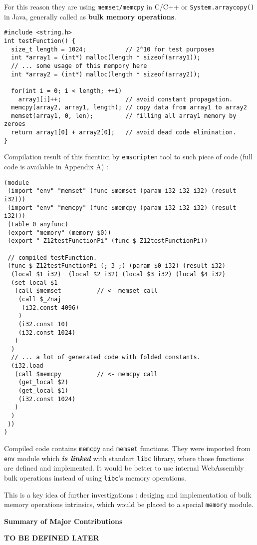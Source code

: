 For this reason they are using \texttt{memset/memcpy} in C/C++ or \texttt{System.arraycopy()} in Java, generally called as \textbf{bulk memory operations}. 

\begin{verbatim}
#include <string.h>
int testFunction() {
  size_t length = 1024;           // 2^10 for test purposes 
  int *array1 = (int*) malloc(length * sizeof(array1));
  // ... some usage of this mempory here
  int *array2 = (int*) malloc(length * sizeof(array2));
  
  for(int i = 0; i < length; ++i)
    array1[i]++;                  // avoid constant propagation. 
  memcpy(array2, array1, length); // copy data from array1 to array2 
  memset(array1, 0, len);         // filling all array1 memory by zeroes 
  return array1[0] + array2[0];   // avoid dead code elimination.
}
\end{verbatim}

Compilation result of this fucntion by \texttt{emscripten} tool to such piece of code (full code is available in Appendix A) :
\small
\begin{verbatim}
(module
 (import "env" "memset" (func $memset (param i32 i32 i32) (result i32)))
 (import "env" "memcpy" (func $memcpy (param i32 i32 i32) (result i32)))
 (table 0 anyfunc)
 (export "memory" (memory $0))
 (export "_Z12testFunctionPi" (func $_Z12testFunctionPi))

 // compiled testFunction.
 (func $_Z12testFunctionPi (; 3 ;) (param $0 i32) (result i32)
  (local $1 i32)  (local $2 i32) (local $3 i32) (local $4 i32)
  (set_local $1
   (call $memset          // <- memset call
    (call $_Znaj
     (i32.const 4096)
    )
    (i32.const 10)
    (i32.const 1024)
   )
  )
  // ... a lot of generated code with folded constants.
  (i32.load
   (call $memcpy          // <- memcpy call
    (get_local $2)
    (get_local $1)
    (i32.const 1024)
   )
  )
 ))
)
\end{verbatim}
\normalsize
Compiled code contains \texttt{memcpy} and \texttt{memset} functions.
They were imported from \texttt{env} module which \textbf{\textit{is linked}} with standart \texttt{libc} library, where those functions are defined and implemented.
It would be better to use internal WebAssembly bulk operations instead of using \texttt{libc}'s memory operations. 

This is a key idea of further investigations : desiging and implementation of bulk memory operations intrinsics, which would be placed to a special \texttt{memory} module.


\Large \textbf{Summary of Major Contributions}

\normalsize

\indent \textbf{TO BE DEFINED LATER}

